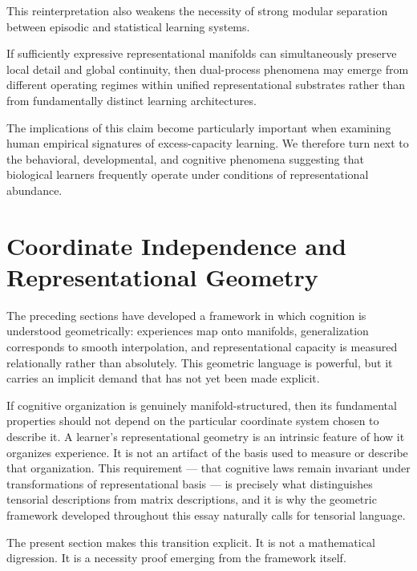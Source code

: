 \documentclass[12pt,a4paper]{article}
\begin{document}
This reinterpretation also weakens the necessity of strong modular separation between episodic and statistical learning systems.

If sufficiently expressive representational manifolds can simultaneously preserve local detail and global continuity, then dual-process phenomena may emerge from different operating regimes within unified representational substrates rather than from fundamentally distinct learning architectures.

The implications of this claim become particularly important when examining human empirical signatures of excess-capacity learning. We therefore turn next to the behavioral, developmental, and cognitive phenomena suggesting that biological learners frequently operate under conditions of representational abundance.


\section{Coordinate Independence and Representational Geometry}
\label{sec:coordinate-independence}

The preceding sections have developed a framework in which cognition is understood geometrically: experiences map onto manifolds, generalization corresponds to smooth interpolation, and representational capacity is measured relationally rather than absolutely. This geometric language is powerful, but it carries an implicit demand that has not yet been made explicit.

If cognitive organization is genuinely manifold-structured, then its fundamental properties should not depend on the particular coordinate system chosen to describe it. A learner's representational geometry is an intrinsic feature of how it organizes experience. It is not an artifact of the basis used to measure or describe that organization. This requirement --- that cognitive laws remain invariant under transformations of representational basis --- is precisely what distinguishes tensorial descriptions from matrix descriptions, and it is why the geometric framework developed throughout this essay naturally calls for tensorial language.

The present section makes this transition explicit. It is not a mathematical digression. It is a necessity proof emerging from the framework itself.
\end{document}
